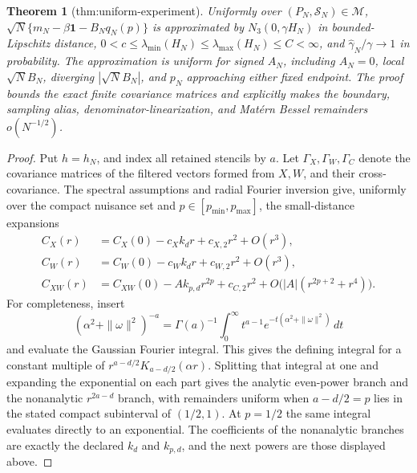 \documentclass{article}
\newtheorem{theorem}{Theorem}
\begin{document}
\begin{theorem}[thm:uniform-experiment]\label{thm:uniform-experiment}
Uniformly over \((P_N,\mathcal S_N)\in\mathcal M\), \(\sqrt N\{m_N-\beta\mathbf 1-B_Nq_N(p)\}\) is approximated by \(N_3(0,\gamma H_N)\) in bounded-Lipschitz distance, \(0<c\le\lambda_{\min}(H_N)\le\lambda_{\max}(H_N)\le C<\infty\), and \(\widehat\gamma_N/\gamma\to1\) in probability. The approximation is uniform for signed \(A_N\), including \(A_N=0\), local \(\sqrt N B_N\), diverging \(|\sqrt N B_N|\), and \(p_N\) approaching either fixed endpoint. The proof bounds the exact finite covariance matrices and explicitly makes the boundary, sampling alias, denominator-linearization, and Mat\'ern Bessel remainders \(o(N^{-1/2})\).
\end{theorem}
\begin{proof}
Put \(h=h_N\), and index all retained stencils by \(a\).  Let \(\Gamma_X,\Gamma_W,\Gamma_C\) denote the covariance matrices of the filtered vectors formed from \(X,W\), and their cross-covariance.  The spectral assumptions and radial Fourier inversion give, uniformly over the compact nuisance set and \(p\in[p_{\min},p_{\max}]\), the small-distance expansions
\[
 \begin{aligned}
 C_X(r)&=C_X(0)-c_Xk_dr+c_{X,2}r^2+O(r^3),\\
 C_W(r)&=C_W(0)-c_Wk_dr+c_{W,2}r^2+O(r^3),\\
 C_{XW}(r)&=C_{XW}(0)-Ak_{p,d}r^{2p}+c_{C,2}r^2
 +O\bigl(|A|(r^{2p+2}+r^4)\bigr).
 \end{aligned}
\]
For completeness, insert
\[
 (\alpha^2+\|\omega\|^2)^{-a}
 =\Gamma(a)^{-1}\int_0^\infty t^{a-1}
 e^{-t(\alpha^2+\|\omega\|^2)}\,dt
\]
and evaluate the Gaussian Fourier integral.  This gives the defining integral for a constant multiple of \(r^{a-d/2}K_{a-d/2}(\alpha r)\).  Splitting that integral at one and expanding the exponential on each part gives the analytic even-power branch and the nonanalytic \(r^{2a-d}\) branch, with remainders uniform when \(a-d/2=p\) lies in the stated compact subinterval of \((1/2,1)\).  At \(p=1/2\) the same integral evaluates directly to an exponential.  The coefficients of the nonanalytic branches are exactly the declared \(k_d\) and \(k_{p,d}\), and the next powers are those displayed above.


\end{proof}
\end{document}
